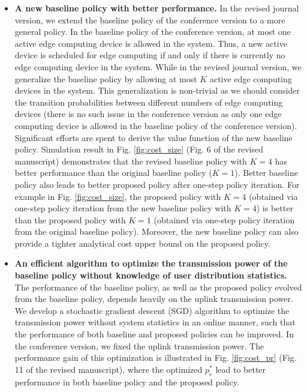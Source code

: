 \documentclass[12pt,onecolumn]{IEEEtran}
\begin{document}
{\begin{itemize}
\item \textbf{A new baseline policy with better performance.} In the revised journal version, we extend the baseline policy of the conference version to a more general policy. In the baseline policy of the conference version, at most one active edge computing device is allowed in the system. Thus, a new active device is scheduled for edge computing if and only if there is currently no edge computing device in the system. While in the revised journal version, we generalize the baseline policy by allowing at most $K$ active edge computing devices in the system. This generalization is non-trivial as we should consider the transition probabilities between different numbers of edge computing devices (there is no such issue in the conference version as only one edge computing device is allowed in the baseline policy of the conference version). Significant efforts are spent to derive the value function of the new baseline policy. Simulation result in Fig. \ref{fig:cost_size} (Fig. 6 of the revised manuscript) demonstrates that the revised baseline policy with $K=4$ has better performance than the original baseline policy ($K=1$). Better baseline policy also leads to better proposed policy after one-step policy iteration. For example in Fig. \ref{fig:cost_size}, the proposed policy with $K=4$ (obtained via one-step policy iteration from the new baseline policy with $K=4$) is better than the proposed policy with $K=1$ (obtained via one-step policy iteration from the original baseline policy). Moreover, the new baseline policy can also provide a tighter analytical cost upper bound on the proposed policy.



\item \textbf{An efficient algorithm to optimize the transmission power of the baseline policy without knowledge of user distribution statistics.} The performance of the baseline policy,  as well as the proposed policy evolved from the baseline policy,  depends heavily on the uplink transmission power. We develop a stochastic gradient descent (SGD) algorithm to optimize the transmission power without system statistics in an online manner, such that the performance of both baseline and proposed policies can be improved. In the conference version, we fixed the uplink transmission power. The performance gain of this optimization is illustrated in Fig. \ref{fig:cost_pr} (Fig. 11 of the revised manuscript), where the optimized $p_r^*$ lead to better performance in both baseline policy and the proposed policy.


\end{itemize}}
\end{document}
